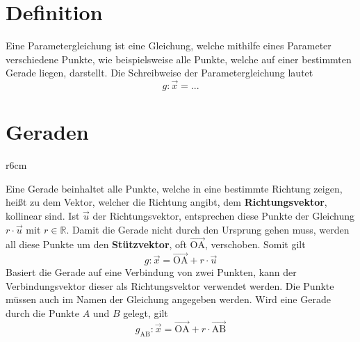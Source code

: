 \documentclass{article}
\begin{document}
 
\newcommand{\vect}[1]{\overrightarrow{#1}}
  
\section{Definition}
Eine Parametergleichung ist eine Gleichung, welche mithilfe eines Parameter verschiedene Punkte, wie beispielsweise alle Punkte, welche auf einer bestimmten Gerade liegen, darstellt. \newline
Die Schreibweise der Parametergleichung lautet 
\[
 g: \vect{x} = ...
\] 
  
\section{Geraden} 
\begin{wrapfigure}{r}{6cm}
  \centering
\end{wrapfigure} 
Eine Gerade beinhaltet alle Punkte, welche in eine bestimmte Richtung zeigen, heißt zu dem Vektor, welcher die Richtung angibt, dem \textbf{Richtungsvektor}, kollinear sind. Ist $\vect{u}$ der Richtungsvektor, entsprechen diese Punkte der Gleichung $r \cdot \vect{u}$ mit $r \in \mathbb{R}$. Damit die Gerade nicht durch den Ursprung gehen muss, werden all diese Punkte um den \textbf{Stützvektor}, oft $\vect{\mathrm{OA}}$, verschoben.
Somit gilt 
\[
 g: \vect{x} = \vect{\mathrm{OA}} + r \cdot \vect{u} 
\] 
Basiert die Gerade auf eine Verbindung von zwei Punkten, kann der Verbindungsvektor dieser als Richtungsvektor verwendet werden. Die Punkte müssen auch im Namen der Gleichung angegeben werden. Wird eine Gerade durch die Punkte $A$ und $B$ gelegt, gilt 
\[
 g_{\mathrm{AB}}: \vect{x} = \vect{\mathrm{OA}} + r \cdot \vect{\mathrm{AB}} 
\]
 
\end{document}

